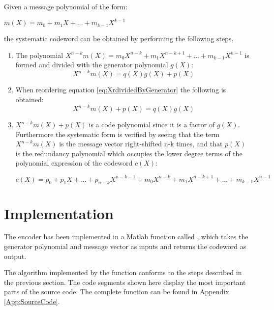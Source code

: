 \documentclass[Main]{subfiles}
\begin{document}
Given a message polynomial of the form:

{\centering 
$m(X) = m_0 + m_1X + ... + m_{k-1}X^{k-1}$ \par}

the systematic codeword can be obtained by performing the following steps.

\begin{enumerate}
\item The polynomial $X^{n-k}m(X) = m_0X^{n-k} + m_1X^{n-k+1} + ... +m_{k-1}X^{n-1}$ is formed and divided with the generator polynomial $g(X)$:
\begin{equation} \label{eq:XrdividedByGenerator}
X^{n-k}m(X) = q(X)g(X)+p(X)
\end{equation}

\item When reordering equation \ref{eq:XrdividedByGenerator} the following is obtained:
\begin{equation} \label{eq:XrdividedByGeneratorReoreded}
X^{n-k}m(X)+ p(X)=q(X)g(X)
\end{equation}

\item $X^{n-k}m(X)+p(X)$ is a code polynomial since it is a factor of $g(X)$. Furthermore the systematic form is verified by seeing that the term $X^{n-k}m(X)$ is the message vector right-shifted n-k times, and that $p(X)$ is the redundancy polynomial which occupies the lower degree terms of the polynomial expression of the codeword $c(X)$:

{\centering 
$c(X) = p_0 + p_1X + ... + p_{n-k}X^{n-k-1} + m_0X^{n-k} + m_1X^{n-k+1}+...+m_{k-1}X^{n-1}$ \par}

\end{enumerate}

\section{Implementation}
The encoder has been implemented in a Matlab function called  , which takes the generator polynomial and message vector as inputs and returns the codeword as output.

The algorithm implemented by the function conforms to the steps described in the previous section. The code segments shown here display the most important parts of the source code. The complete function can be found in Appendix \ref{App:SourceCode}. 
\end{document}

